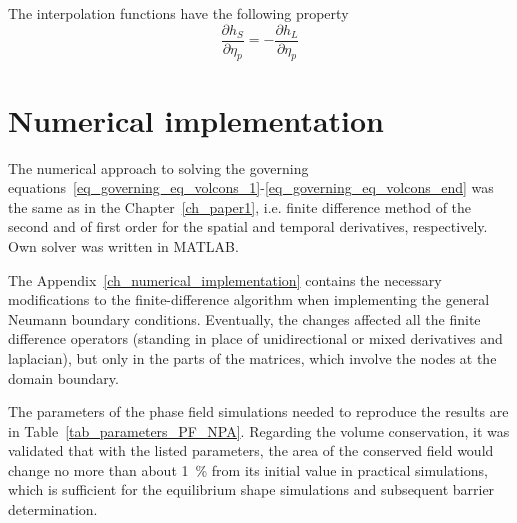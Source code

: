 		The interpolation functions have the following property
		\begin{equation}
			\frac{\partial h_S}{\partial \eta_p} = -\frac{\partial h_L}{\partial \eta_p}
		\end{equation}
		

\section{Numerical implementation}
The numerical approach to solving the governing equations~\ref{eq_governing_eq_volcons_1}-\ref{eq_governing_eq_volcons_end} was the same as in the Chapter~\ref{ch_paper1}, i.e. finite difference method of the second and of first order for the spatial and temporal derivatives, respectively. Own solver was written in MATLAB.

The Appendix~\ref{ch_numerical_implementation} contains the necessary modifications to the finite-difference algorithm when implementing the general Neumann boundary conditions. Eventually, the changes affected all the finite difference operators (standing in place of unidirectional or mixed derivatives and laplacian), but only in the parts of the matrices, which involve the nodes at the domain boundary.

The parameters of the phase field simulations needed to reproduce the results are in Table~\ref{tab_parameters_PF_NPA}. Regarding the volume conservation, it was validated that with the listed parameters, the area of the conserved field would change no more than about 1~\% from its initial value in practical simulations, which is sufficient for the equilibrium shape simulations and subsequent barrier determination.

